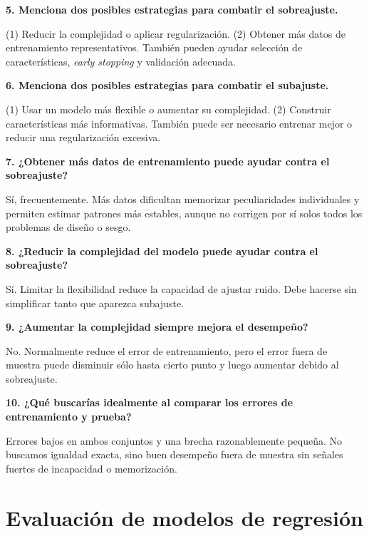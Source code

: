 \documentclass[11pt]{article}
\newcommand{\pregunta}[1]{\vspace{2mm}\textbf{#1}}
\begin{document}
\pregunta{5. Menciona dos posibles estrategias para combatir el sobreajuste.}
\begin{respuesta}
(1) Reducir la complejidad o aplicar regularización. (2) Obtener más datos de entrenamiento representativos. También pueden ayudar selección de características, \emph{early stopping} y validación adecuada.
\end{respuesta}

\pregunta{6. Menciona dos posibles estrategias para combatir el subajuste.}
\begin{respuesta}
(1) Usar un modelo más flexible o aumentar su complejidad. (2) Construir características más informativas. También puede ser necesario entrenar mejor o reducir una regularización excesiva.
\end{respuesta}

\pregunta{7. ¿Obtener más datos de entrenamiento puede ayudar contra el sobreajuste?}
\begin{respuesta}
Sí, frecuentemente. Más datos dificultan memorizar peculiaridades individuales y permiten estimar patrones más estables, aunque no corrigen por sí solos todos los problemas de diseño o sesgo.
\end{respuesta}

\pregunta{8. ¿Reducir la complejidad del modelo puede ayudar contra el sobreajuste?}
\begin{respuesta}
Sí. Limitar la flexibilidad reduce la capacidad de ajustar ruido. Debe hacerse sin simplificar tanto que aparezca subajuste.
\end{respuesta}

\pregunta{9. ¿Aumentar la complejidad siempre mejora el desempeño?}
\begin{respuesta}
No. Normalmente reduce el error de entrenamiento, pero el error fuera de muestra puede disminuir sólo hasta cierto punto y luego aumentar debido al sobreajuste.
\end{respuesta}

\pregunta{10. ¿Qué buscarías idealmente al comparar los errores de entrenamiento y prueba?}
\begin{respuesta}
Errores bajos en ambos conjuntos y una brecha razonablemente pequeña. No buscamos igualdad exacta, sino buen desempeño fuera de muestra sin señales fuertes de incapacidad o memorización.
\end{respuesta}

\section{Evaluación de modelos de regresión}
\end{document}
